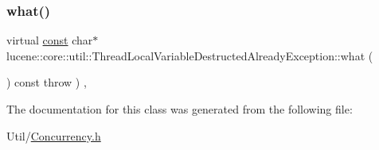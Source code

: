 \subsubsection{\texorpdfstring{what()}{what()}}
{\footnotesize\ttfamily virtual \mbox{\hyperlink{ZlibCrc32_8h_a2c212835823e3c54a8ab6d95c652660e}{const}} char$\ast$ lucene\+::core\+::util\+::\+Thread\+Local\+Variable\+Destructed\+Already\+Exception\+::what (\begin{DoxyParamCaption}{ }\end{DoxyParamCaption}) const throw  ) \hspace{0.3cm}{\ttfamily [inline]}, {\ttfamily [virtual]}}



The documentation for this class was generated from the following file\+:\begin{DoxyCompactItemize}
\item 
Util/\mbox{\hyperlink{Concurrency_8h}{Concurrency.\+h}}\end{DoxyCompactItemize}
